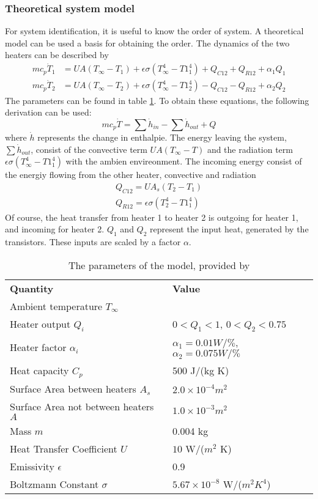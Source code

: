 \subsubsection{Theoretical system model}
For system identification, it is useful to know the order of system. A theoretical model can be used a basis for obtaining the order. The dynamics of the two heaters can be described by \cite{APMonitor}
\begin{align}
    mc_p\dot{T}_1 &= U A (T_{\infty} - T_1) + \epsilon\sigma(T^4_{\infty} - T1^4_1) + Q_{C12} + Q_{R12} +\alpha_1 Q_1 \nonumber \\
    mc_p\dot{T}_2 &= U A (T_{\infty} - T_2) + \epsilon\sigma(T^4_{\infty} - T1^4_2) - Q_{C12} - Q_{R12} +\alpha_2 Q_2 \nonumber
\end{align}
The parameters can be found in table \ref{tab:theModelPara}. To obtain these equations, the following derivation can be used:
$$
    mc_p\dot{T} = \sum\dot{h}_{in} - \sum\dot{h}_{out} + Q
$$
where $\dot{h}$ represents the change in enthalpie. The energy leaving the system, $ \sum\dot{h}_{out}$, consist of the convective term  $U A (T_{\infty} - T)$ and the radiation term $\epsilon\sigma(T^4_{\infty} - T1^4_1)$ with the ambien envireonment. The incoming energy consist of the energiy flowing from the other heater, convective and radiation
\begin{align}
    Q_{C12} = U A_s (T_2 -T_1) \nonumber \\
    Q_{R12} = \epsilon\sigma(T^4_{2} - T1^4_1) \nonumber
\end{align}
Of course, the heat transfer from heater 1 to heater 2 is outgoing for heater 1, and incoming for heater 2. $Q_1$ and $Q_2$ represent the input heat, generated by the transistors. These inputs are scaled by a factor $\alpha$.
\begin{table}[ht]
    \centering
    \begin{tabular}{l|l}
    \textbf{Quantity} & \textbf{Value} \\
    Ambient temperature $T_{\infty}$    & \\
    Heater output $Q_i$ & $0<Q_1<1$, $0<Q_2<0.75$\\
    Heater factor $\alpha_i$ & $\alpha_1 = 0.01W/\%$, $\alpha_2 = 0.075W/\%$ \\
    Heat capacity $C_p$ & 500 J/(kg K)\\
    Surface Area between heaters $A_s$ & $2.0\times10^{-4} m^2$\\
    Surface Area not between heaters $A$ & $1.0\times10^{-3} m^2$\\
    Mass $m$ & 0.004 kg\\
    Heat Transfer Coefficient $U$ & $10$ W/($m^2$ K) \\
    Emissivity $\epsilon$ & 0.9\\
    Boltzmann Constant $\sigma$ & $5.67\times10^{-8}$ W/($m^2 K^4$)
    \end{tabular}
    \caption{The parameters of the model, provided by \cite{APMonitor}}
    \label{tab:theModelPara}
\end{table}